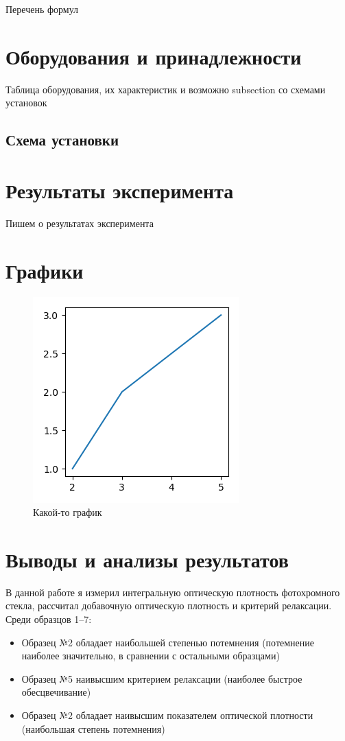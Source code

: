 Перечень формул

\section{Оборудования и принадлежности}\label{sec:stuff}

Таблица оборудования, их характеристик и возможно subsection со схемами установок
\subsection{Схема установки}\label{subsec:schemes}

\section{Результаты эксперимента}\label{sec:results}

Пишем о результатах эксперимента

\section{Графики}\label{sec:graphics}

\begin{figure}[H]
        \centering
        \includegraphics{figures/example}%
        \caption{Какой-то график}
		\label{fig:someFigure}
\end{figure}

\section{Выводы и анализы результатов}\label{sec:conclution}
В данной работе я измерил интегральную оптическую плотность фотохромного стекла, рассчитал добавочную оптическую плотность и критерий релаксации.
Среди образцов 1--7:
\begin{itemize}
	\item Образец №2 обладает наибольшей степенью потемнения (потемнение наиболее значительно, в сравнении с остальными образцами)
	\item Образец №5 наивысшим критерием релаксации (наиболее быстрое обесцвечивание)
	\item Образец №2 обладает наивысшим показателем оптической плотности (наибольшая степень потемнения)
\end{itemize}
